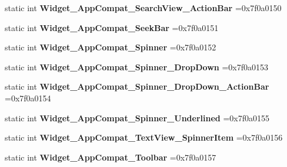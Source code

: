 \begin{DoxyCompactItemize}
static int {\bfseries Widget\+\_\+\+App\+Compat\+\_\+\+Search\+View\+\_\+\+Action\+Bar} =0x7f0a0150
\item 
\mbox{\label{classandroid_1_1support_1_1design_1_1R_1_1style_a940fa0c978593ab05f6ce1f9023159ee}} 
static int {\bfseries Widget\+\_\+\+App\+Compat\+\_\+\+Seek\+Bar} =0x7f0a0151
\item 
\mbox{\label{classandroid_1_1support_1_1design_1_1R_1_1style_af0e881fdee487121cc83d3782be2ef33}} 
static int {\bfseries Widget\+\_\+\+App\+Compat\+\_\+\+Spinner} =0x7f0a0152
\item 
\mbox{\label{classandroid_1_1support_1_1design_1_1R_1_1style_abf12e69e841a0aa6acb9ad119b19ba2d}} 
static int {\bfseries Widget\+\_\+\+App\+Compat\+\_\+\+Spinner\+\_\+\+Drop\+Down} =0x7f0a0153
\item 
\mbox{\label{classandroid_1_1support_1_1design_1_1R_1_1style_a6e75014a574cd0b6c2fc3229212f1d6d}} 
static int {\bfseries Widget\+\_\+\+App\+Compat\+\_\+\+Spinner\+\_\+\+Drop\+Down\+\_\+\+Action\+Bar} =0x7f0a0154
\item 
\mbox{\label{classandroid_1_1support_1_1design_1_1R_1_1style_ac7f2b777ef9bcd3d4996d0afec03d5cb}} 
static int {\bfseries Widget\+\_\+\+App\+Compat\+\_\+\+Spinner\+\_\+\+Underlined} =0x7f0a0155
\item 
\mbox{\label{classandroid_1_1support_1_1design_1_1R_1_1style_a25d35132b318c1c6de067ac1476fd234}} 
static int {\bfseries Widget\+\_\+\+App\+Compat\+\_\+\+Text\+View\+\_\+\+Spinner\+Item} =0x7f0a0156
\item 
\mbox{\label{classandroid_1_1support_1_1design_1_1R_1_1style_a925c960bd429fa39643d3101681642c2}} 
static int {\bfseries Widget\+\_\+\+App\+Compat\+\_\+\+Toolbar} =0x7f0a0157
\item 
\mbox{\label{classandroid_1_1support_1_1design_1_1R_1_1style_a83ac52bec26ae2bb8acfdf7b3992a0e5}} 

\end{DoxyCompactItemize}

